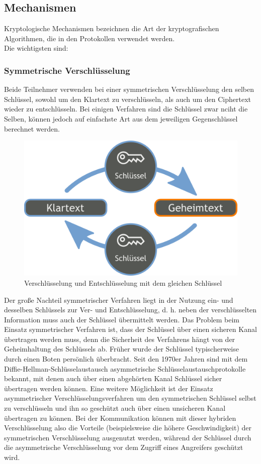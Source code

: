 \documentclass[a4paper,10pt,DIV9, BCOR12mm, oneside,openright,openbib]{scrreprt}
\theoremstyle{definition}
\theoremstyle{plain}
\begin{document}
\subsection{Mechanismen}
Kryptologische Mechanismen bezeichnen die Art der kryptografischen Algorithmen, die in den Protokollen verwendet werden.\\ Die wichtigsten sind:

\subsubsection{Symmetrische Verschlüsselung}
Beide Teilnehmer verwenden bei einer symmetrischen Verschlüsselung den selben Schlüssel, sowohl um den Klartext zu verschlüsseln, als auch um den Ciphertext wieder zu entschlüsseln. Bei einigen Verfahren sind die Schlüssel zwar nciht die Selben, können jedoch auf einfachste Art aus dem jeweiligen Gegenschlüssel berechnet werden.
\begin{figure}
 \centering
 \includegraphics[bb=0 0 512 325,scale=0.35,keepaspectratio=true]{./Bilder/512px-Orange_blue_symmetric_cryptography_de.png}
 \caption{Verschlüsselung und Entschlüsselung mit dem gleichen Schlüssel}
 \label{fig:SymmV}
\end{figure}
Der große Nachteil symmetrischer Verfahren liegt in der Nutzung ein- und desselben Schlüssels zur Ver- und Entschlüsselung, d. h. neben der verschlüsselten Information muss auch der Schlüssel übermittelt werden. Das Problem beim Einsatz symmetrischer Verfahren ist, dass der Schlüssel über einen sicheren Kanal übertragen werden muss, denn die Sicherheit des Verfahrens hängt von der Geheimhaltung des Schlüssels ab. Früher wurde der Schlüssel typischerweise durch einen Boten persönlich überbracht. Seit den 1970er Jahren sind mit dem Diffie-Hellman-Schlüsselaustausch asymmetrische Schlüsselaustauschprotokolle bekannt, mit denen auch über einen abgehörten Kanal Schlüssel sicher übertragen werden können. Eine weitere Möglichkeit ist der Einsatz asymmetrischer Verschlüsselungsverfahren um den symmetrischen Schlüssel selbst zu verschlüsseln und ihn so geschützt auch über einen unsicheren Kanal übertragen zu können. Bei der Kommunikation können mit dieser hybriden Verschlüsselung also die Vorteile (beispielsweise die höhere Geschwindigkeit) der symmetrischen Verschlüsselung ausgenutzt werden, während der Schlüssel durch die asymmetrische Verschlüsselung vor dem Zugriff eines Angreifers geschützt wird.
\end{document}
